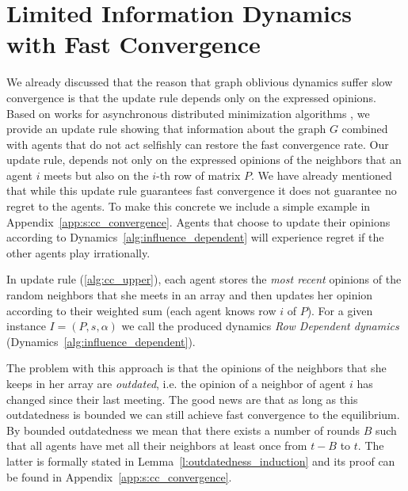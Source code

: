 \section{Limited Information Dynamics with Fast Convergence}\label{s:cc_convergence}

We already discussed that the reason that graph oblivious dynamics suffer slow
convergence is that the update rule depends only on the expressed opinions.
Based on works for asynchronous distributed minimization algorithms
\cite{BT97,CC16}, we provide an update rule showing that information about the
graph $G$ combined with agents that do not act selfishly can restore the
fast convergence rate.
Our update rule, depends not only on the expressed opinions of the
neighbors that an agent $i$ meets but also on the $i$-th row of matrix $P$.
We have already mentioned that while this update rule guarantees fast convergence
it does not guarantee no regret to the agents.  To make this concrete we include
a simple example in Appendix~\ref{app:s:cc_convergence}.  Agents that choose
to update their opinions according to Dynamics~\ref{alg:influence_dependent}
will experience regret if the other agents play irrationally.

In update rule (\ref{alg:cc_upper}), each agent stores the
\emph{most recent} opinions of the random neighbors that she meets in an array
and then updates her opinion according to their weighted sum
(each agent knows row $i$ of $P$). For a given instance
$I=(P,s,\alpha)$ we call the produced dynamics \emph{Row Dependent dynamics}
(Dynamics~\ref{alg:influence_dependent}).

The problem with this approach is that the opinions of the neighbors
that she keeps in her array are \emph{outdated}, i.e. the opinion of
a neighbor of agent $i$ has changed since their last meeting.
The good news are that as long as this outdatedness
is bounded we can still achieve fast convergence to the
equilibrium.  By bounded outdatedness we mean that there exists a
number of rounds $B$ such that all agents have met all their neighbors
at least once from $t-B$ to $t$.  The latter is formally stated in
Lemma~\ref{l:outdatedness_induction} and its proof can be found in
Appendix~\ref{app:s:cc_convergence}.

